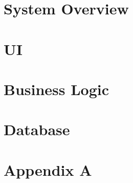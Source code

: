 \documentclass[11pt,letterpaper]{article}
\begin{document}
\section{System Overview}

\newpage
%
\newpage
\section{UI}

\newpage
\section{Business Logic}

\newpage
\section{Database}

\newpage
\section{Appendix A}

\newpage



{}
\end{document}
